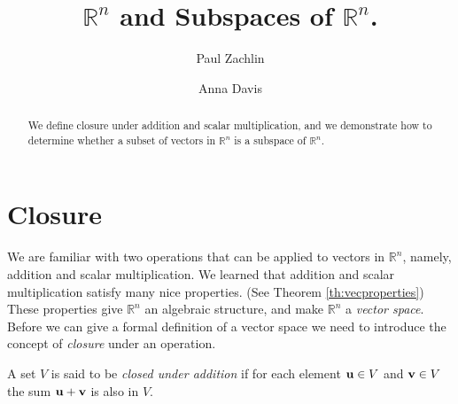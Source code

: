 \documentclass{ximera}
\author{Paul Zachlin \and Anna Davis} \title{$\mathbb{R}^n$ and Subspaces of $\mathbb{R}^n$.} \license{CC-BY 4.0}
\renewcommand{\vec}[1]{{\bf #1}}
\newcommand{\RR}{\mathbb{R}}
\newcommand{\dfn}{\textit}
\begin{document}
\begin{abstract}
We define closure under addition and scalar multiplication, and we demonstrate how to determine whether a subset of vectors in $\RR^n$ is a subspace of $\RR^n$.
\end{abstract}

\maketitle

\section*{Closure}

We are familiar with two operations that can be applied to vectors in $\RR^n$, namely, addition and scalar multiplication. We learned that addition and scalar multiplication satisfy many nice properties. (See Theorem \ref{th:vecproperties}) These properties give $\RR^n$ an algebraic structure, and make $\RR^n$ a \dfn{vector space}.  Before we can give a formal definition of a vector space we need to introduce the concept of \dfn{closure} under an operation.



 \begin{definition} 
  A set $V$ is said to be \emph{closed under addition} if for each element $\vec{u} \in V$ and $\vec{v} \in V$ the sum $\vec{u}+\vec{v}$ is also in $V$.
\end{definition}
\end{document}
